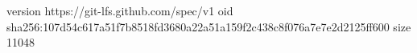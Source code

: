 version https://git-lfs.github.com/spec/v1
oid sha256:107d54c617a51f7b8518fd3680a22a51a159f2c438c8f076a7e7e2d2125ff600
size 11048
